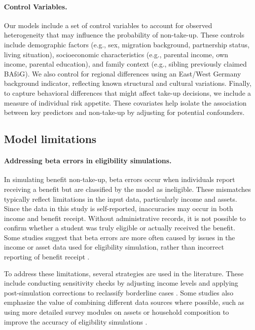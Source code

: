 \paragraph{Control Variables.}
Our models include a set of control variables to account for observed heterogeneity that may influence the probability of non-take-up. These controls include demographic factors (e.g., sex, migration background, partnership status, living situation), socioeconomic characteristics (e.g., parental income, own income, parental education), and family context (e.g., sibling previously claimed BAföG). We also control for regional differences using an East/West Germany background indicator, reflecting known structural and cultural variations. Finally, to capture behavioral differences that might affect take-up decisions, we include a measure of individual risk appetite. These covariates help isolate the association between key predictors and non-take-up by adjusting for potential confounders.


\subsection{Model limitations}
\label{subsection:model_limitations}

\paragraph{Addressing beta errors in eligibility simulations.}
In simulating benefit non-take-up, beta errors occur when individuals report receiving a benefit but are classified by the model as ineligible. 
These mismatches typically reflect limitations in the input data, particularly income and assets.
Since the data in this study is self-reported, inaccuracies may occur in both income and benefit receipt.
Without administrative records, it is not possible to confirm whether a student was truly eligible or actually received the benefit. 
Some studies suggest that beta errors are more often caused by issues in the income or asset data used for eligibility simulation, rather than incorrect reporting of benefit receipt \citep{frick_claim_2007, janssens_takemod_2022}. 

To address these limitations, several strategies are used in the literature. 
These include conducting sensitivity checks by adjusting income levels and applying post-simulation corrections to reclassify borderline cases \citep{herber_non-take-up_2019}. 
Some studies also emphasize the value of combining different data sources where possible, such as using more detailed survey modules on assets or household composition to improve the accuracy of eligibility simulations \citep{janssens_takemod_2022}. 

